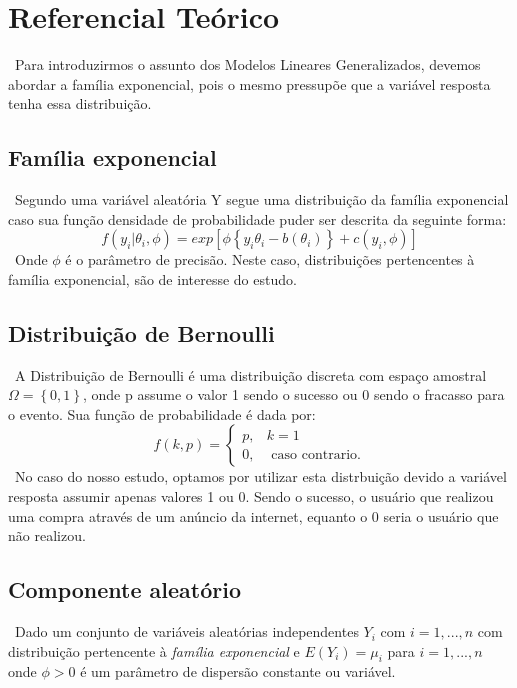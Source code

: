 \documentclass[a4paper]{article}
\begin{document}
\section{Referencial Teórico}

\quad \ Para introduzirmos o assunto dos Modelos Lineares Generalizados, devemos abordar a família exponencial, pois o mesmo pressupõe que a variável resposta tenha essa distribuição. 

\subsection{Família exponencial}
\quad \ Segundo \cite{Turkman} uma variável aleatória Y segue uma distribuição da família exponencial caso sua função densidade de probabilidade puder ser descrita da seguinte forma:
\begin{equation*}
    f(y_i|\theta_i,\phi) = exp[\phi\left\{y_i\theta_i-b(\theta_i)\right\}+c(y_i,\phi)]
\end{equation*}
\quad \ Onde $\phi$ é o parâmetro de precisão. Neste caso, distribuições pertencentes à família exponencial, são de interesse do estudo.

\subsection{Distribuição de Bernoulli}
\quad \ A Distribuição de Bernoulli é uma distribuição discreta com espaço amostral $\Omega=\left\{0,1\right\}$, onde p assume o valor 1 sendo o sucesso ou 0 sendo o fracasso para o evento. Sua função de probabilidade é dada por:
\begin{equation*}
f(k,p)= \left\{ \begin{array}{ll} p, & k=1\\
0, & \mbox{ caso contrario}.\end{array} \right.
\end{equation*}
\quad \ No caso do nosso estudo, optamos por utilizar esta distrbuição devido a variável resposta assumir apenas valores 1 ou 0. Sendo o sucesso, o usuário que realizou uma compra através de um anúncio da internet, equanto o 0 seria o usuário que não realizou.

\subsection{Componente aleatório}
\quad \ Dado um conjunto de variáveis aleatórias independentes $Y_i$ com $i=1,...,n$ com distribuição pertencente à \textit{família exponencial} e $E(Y_i)=\mu_i$ para $i=1,...,n$ onde $\phi>0$ é um parâmetro de dispersão constante ou variável.
\end{document}
